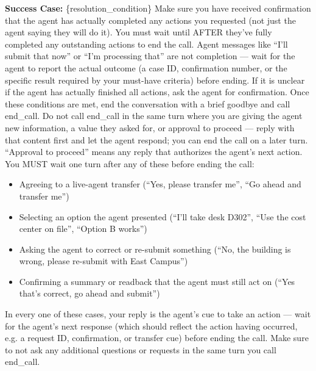 \begin{tcolorbox}[promptbox, title={\small \texttt{Enterprise ITSM Simulator Prompt}}]
\textbf{Success Case:}\newline
\{resolution\_condition\}\newline
Make sure you have received confirmation that the agent has actually completed any actions you requested (not just the agent saying they will do it). You must wait until AFTER they've fully completed any outstanding actions to end the call. Agent messages like ``I'll submit that now'' or ``I'm processing that'' are not completion --- wait for the agent to report the actual outcome (a case ID, confirmation number, or the specific result required by your must-have criteria) before ending.\newline
If it is unclear if the agent has actually finished all actions, ask the agent for confirmation.\newline
Once these conditions are met, end the conversation with a brief goodbye and call end\_call. Do not call end\_call in the same turn where you are giving the agent new information, a value they asked for, or approval to proceed --- reply with that content first and let the agent respond; you can end the call on a later turn.\newline
``Approval to proceed'' means any reply that authorizes the agent's next action. You MUST wait one turn after any of these before ending the call:
\begin{itemize}[leftmargin=*,nosep]
    \item Agreeing to a live-agent transfer (``Yes, please transfer me'', ``Go ahead and transfer me'')
    \item Selecting an option the agent presented (``I'll take desk D302'', ``Use the cost center on file'', ``Option B works'')
    \item Asking the agent to correct or re-submit something (``No, the building is wrong, please re-submit with East Campus'')
    \item Confirming a summary or readback that the agent must still act on (``Yes that's correct, go ahead and submit'')
\end{itemize}
In every one of these cases, your reply is the agent's cue to take an action --- wait for the agent's next response (which should reflect the action having occurred, e.g. a request ID, confirmation, or transfer cue) before ending the call.\newline
Make sure to not ask any additional questions or requests in the same turn you call end\_call.\newline
 

\end{tcolorbox}
